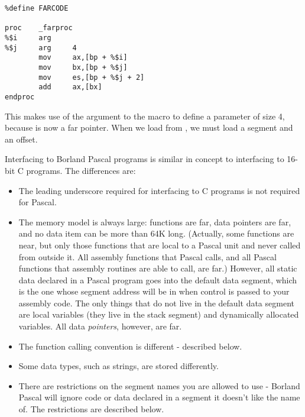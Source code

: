 \begin{lstlisting}
%define FARCODE

proc    _farproc
%$i     arg
%$j     arg     4
        mov     ax,[bp + %$i]
        mov     bx,[bp + %$j]
        mov     es,[bp + %$j + 2]
        add     ax,[bx]
endproc
\end{lstlisting}

This makes use of the argument to the  macro to define a
parameter of size 4, because  is now a far pointer. When we
load from , we must load a segment and an offset.


Interfacing to Borland Pascal programs is similar in concept to
interfacing to 16-bit C programs. The differences are:

\begin{itemize}
    \item{The leading underscore required for interfacing to C programs is
        not required for Pascal.}

    \item{The memory model is always large: functions are far, data
        pointers are far, and no data item can be more than 64K long.
        (Actually, some functions are near, but only those functions that
        are local to a Pascal unit and never called from outside it. All
        assembly functions that Pascal calls, and all Pascal functions that
        assembly routines are able to call, are far.) However, all static
        data declared in a Pascal program goes into the default data
        segment, which is the one whose segment address will be in 
        when control is passed to your assembly code. The only things that
        do not live in the default data segment are local variables (they
        live in the stack segment) and dynamically allocated variables. All
        data \emph{pointers}, however, are far.}

    \item{The function calling convention is different - described below.}

    \item{Some data types, such as strings, are stored differently.}

    \item{There are restrictions on the segment names you are allowed to
        use - Borland Pascal will ignore code or data declared in a segment
        it doesn't like the name of. The restrictions are described below.}
\end{itemize}

